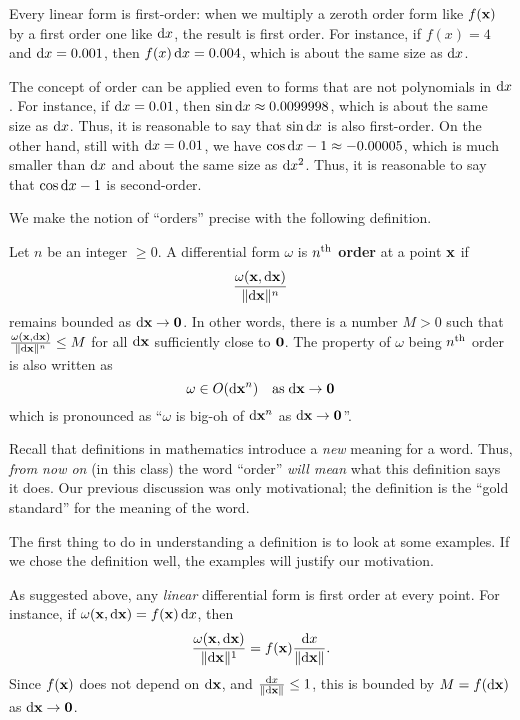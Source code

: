 \documentclass[12pt]{amsart}
\begin{document}
Every linear form is first-order: when we multiply a zeroth order form like $f(\mathbf{x})$ by a first order one like $\mathrm{d} x$, the result is first order.
For instance, if $f(x) = 4$ and $\mathrm{d} x = 0.001$, then $f(x)\,\mathrm{d} x = 0.004$, which is about the same size as $\mathrm{d} x$.

The concept of order can be applied even to forms that are not polynomials in $\mathrm{d} x$.
For instance, if $\mathrm{d} x=0.01$, then $\sin \mathrm{d} x \approx 0.0099998$, which is about the same size as $\mathrm{d} x$.
Thus, it is reasonable to say that $\sin\mathrm{d} x$ is also first-order.
On the other hand, still with $\mathrm{d} x=0.01$, we have $\cos \mathrm{d} x - 1 \approx -0.00005$, which is much smaller than $\mathrm{d} x$ and about the same size as $\mathrm{d} x^2$.
Thus, it is reasonable to say that $\cos \mathrm{d} x - 1$ is second-order.

We make the notion of ``orders'' precise with the following definition.

\begin{defn}\label{def:order}
  Let $n$ be an integer $\ge 0$.
  A differential form $\omega$ is \textbf{$n^{\mathrm{th}}$ order} at a point $\mathbf{x}$ if
  \[ \frac{\omega(\mathbf{x},\mathrm{d} \mathbf{x})}{\Vert \mathrm{d} \mathbf{x} \Vert^n} \]
  remains bounded as $\mathrm{d} \mathbf{x}\to\mathbf{0}$.  In other words, there is a number $M>0$ such that
  \( \frac{\omega(\mathbf{x},\mathrm{d} \mathbf{x})}{\Vert \mathrm{d} \mathbf{x} \Vert^n} \le M \)
  for all $\mathrm{d} \mathbf{x}$ sufficiently close to $\mathbf{0}$.
  The property of $\omega$ being $n^{\mathrm{th}}$ order is also written as
  \[ \omega \in O(\mathrm{d} \mathbf{x}^n) \quad\text{as}\;\mathrm{d} \mathbf{x}\to\mathbf{0} \]
  which is pronounced as ``$\omega$ is big-oh of $\mathrm{d} \mathbf{x}^n$ as $\mathrm{d} \mathbf{x}\to\mathbf{0}$''.
\end{defn}

Recall that definitions in mathematics introduce a \emph{new} meaning for a word.
Thus, \emph{from now on} (in this class) the word ``order'' \emph{will mean} what this definition says it does.
Our previous discussion was only motivational; the definition is the ``gold standard'' for the meaning of the word.

The first thing to do in understanding a definition is to look at some examples.
If we chose the definition well, the examples will justify our motivation.

\begin{eg}
  As suggested above, any \emph{linear} differential form is first order at every point.
  For instance, if $\omega(\mathbf{x},\mathrm{d}\mathbf{x}) = f(\mathbf{x}) \, \mathrm{d} x$, then
  \[ \frac{\omega(\mathbf{x},\mathrm{d} \mathbf{x})}{\Vert \mathrm{d} \mathbf{x} \Vert^1} = f(\mathbf{x}) \frac{\mathrm{d} x}{\Vert \mathrm{d} \mathbf{x} \Vert}.\]
  Since $f(\mathbf{x})$ does not depend on $\mathrm{d} \mathbf{x}$, and $\frac{\mathrm{d} x}{\Vert \mathrm{d} \mathbf{x} \Vert} \le 1$, this is bounded by $M=f(\mathrm{d} \mathbf{x})$ as $\mathrm{d} \mathbf{x}\to\mathbf{0}$.
\end{eg}
\end{document}
